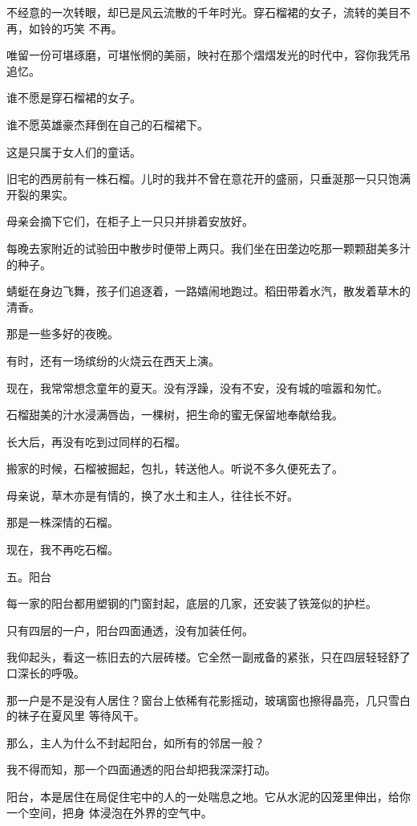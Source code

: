 \documentclass[12pt,a4paper]{article}
\def\blankrev{\vspace{1ex}}									%
\newcommand{\subpart}[1]{
	\begingroup \par
	\vspace{1ex} \centering #1
	\par \endgroup \nopagebreak[4]
}
\begin{document}
		不经意的一次转眼，却已是风云流散的千年时光。穿石榴裙的女子，流转的美目不再，如铃的巧笑
	不再。

		唯留一份可堪琢磨，可堪怅惘的美丽，映衬在那个熠熠发光的时代中，容你我凭吊追忆。\par
		谁不愿是穿石榴裙的女子。\par
		谁不愿英雄豪杰拜倒在自己的石榴裙下。\par
		这是只属于女人们的童话。

		\blankrev
		旧宅的西房前有一株石榴。儿时的我并不曾在意花开的盛丽，只垂涎那一只只饱满开裂的果实。\par
		母亲会摘下它们，在柜子上一只只并排着安放好。\par
		每晚去家附近的试验田中散步时便带上两只。我们坐在田垄边吃那一颗颗甜美多汁的种子。\par
		蜻蜓在身边飞舞，孩子们追逐着，一路嬉闹地跑过。稻田带着水汽，散发着草木的清香。\par
		那是一些多好的夜晚。\par
		有时，还有一场缤纷的火烧云在西天上演。\par
		现在，我常常想念童年的夏天。没有浮躁，没有不安，没有城的喧嚣和匆忙。\par
		石榴甜美的汁水浸满唇齿，一棵树，把生命的蜜无保留地奉献给我。\par
		长大后，再没有吃到过同样的石榴。\par
		搬家的时候，石榴被掘起，包扎，转送他人。听说不多久便死去了。\par
		母亲说，草木亦是有情的，换了水土和主人，往往长不好。\par
		那是一株深情的石榴。\par
		现在，我不再吃石榴。


		\subpart{五。阳台}

		每一家的阳台都用塑钢的门窗封起，底层的几家，还安装了铁笼似的护栏。\par
		只有四层的一户，阳台四面通透，没有加装任何。\par
		我仰起头，看这一栋旧去的六层砖楼。它全然一副戒备的紧张，只在四层轻轻舒了口深长的呼吸。

		那一户是不是没有人居住？窗台上依稀有花影摇动，玻璃窗也擦得晶亮，几只雪白的袜子在夏风里
	等待风干。

		那么，主人为什么不封起阳台，如所有的邻居一般？\par
		我不得而知，那一个四面通透的阳台却把我深深打动。

		阳台，本是居住在局促住宅中的人的一处喘息之地。它从水泥的囚笼里伸出，给你一个空间，把身
	体浸泡在外界的空气中。
\end{document}
